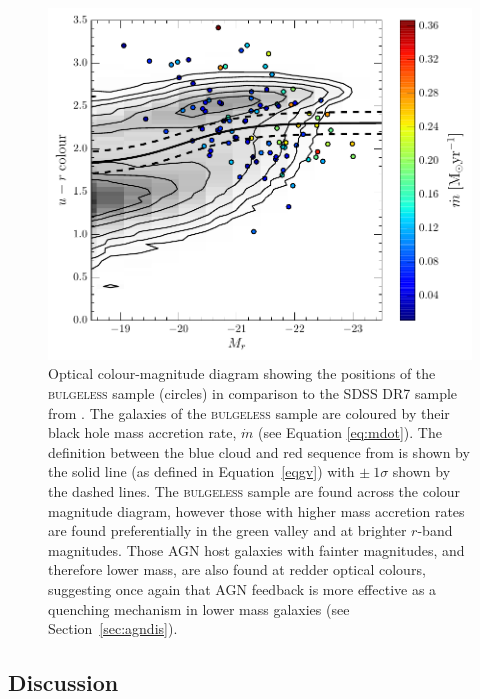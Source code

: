 {\begin{figure}
\centering
\includegraphics[width=\textwidth]{agn/CMD_DISCDOM_coloured_accretion_rate.pdf}
\caption[Colour-magnitude diagram for the \textsc{bulgeless} sample coloured by black hole mass accretion rate]{Optical colour-magnitude diagram showing the positions of the \textsc{bulgeless} sample (circles) in comparison to the SDSS DR7 sample from \citet{Baldry04}. The galaxies of the \textsc{bulgeless} sample are coloured by their black hole mass accretion rate, $\dot{m}$ (see Equation \ref{eq:mdot}). The definition between the blue cloud and red sequence  from \citet{Baldry04} is shown by the solid line (as defined in Equation~\ref{eqgv}) with $\pm~1\sigma$ shown by the dashed lines. The \textsc{bulgeless} sample are found across the colour magnitude diagram, however those with higher mass accretion rates are found preferentially in the green valley and at brighter $r$-band magnitudes. Those AGN host galaxies with fainter magnitudes, and therefore lower mass, are also found at redder optical colours, suggesting once again that AGN feedback is more effective as a quenching mechanism in lower mass galaxies (see Section~\ref{sec:agndis}).}
\label{fig:cmdmdot}
\end{figure}


%
%  
\subsection{Discussion}\label{sec:intdiscussion}
%
%

}
